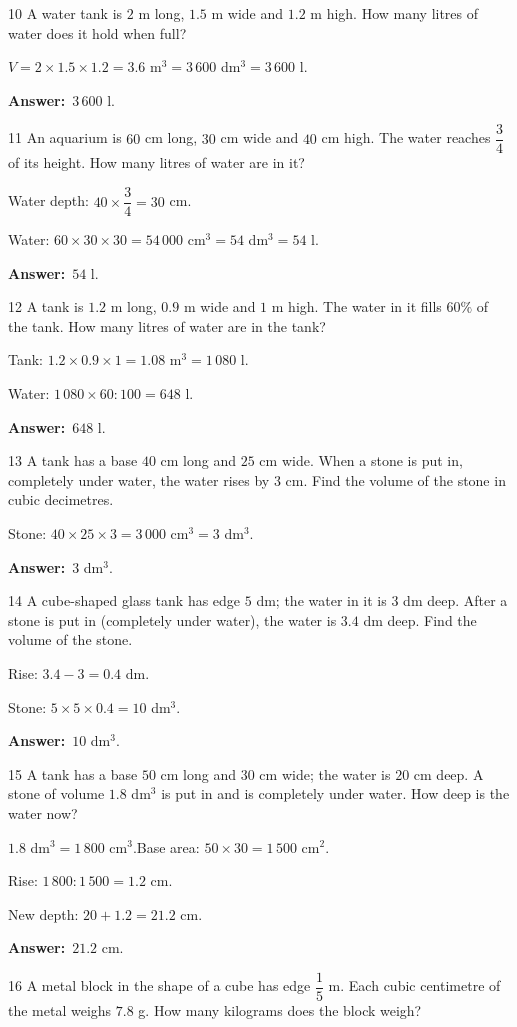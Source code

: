 \documentclass[11pt]{article}
\newif\ifsol \solfalse
\providecommand{\AnsWord}{Đáp số}
\newcommand{\dapso}[1]{\par\textbf{\AnsWord:}\ #1}
\newcommand{\probsol}[1]{%
  \begin{lrbox}{\solmeasure}\begin{minipage}{\dimexpr\linewidth-24pt\relax}#1\end{minipage}\end{lrbox}%
  \ifsol
    \begin{solbox}#1\end{solbox}%
  \else
    \setlength{\solht}{\dimexpr\ht\solmeasure+\dp\solmeasure+0.85cm\relax}%
    \ifdim\solht<1.35cm\setlength{\solht}{1.35cm}\fi
    \begin{tcolorbox}[colback=white,colframe=Line,boxrule=0.8pt,arc=5pt,
      left=8pt,right=8pt,top=4pt,bottom=4pt,height=\solht]{\footnotesize\color{Slate}\itshape\WorkWord}\end{tcolorbox}%
  \fi}
\newcommand{\gap}{\vspace{0.3cm}}
\def\WorkWord{Your work:}
\def\AnsWord{Answer}
\begin{document}
\gap
\begin{probbox}{10}{\relax}
A water tank is $2$ m long, $1.5$ m wide and $1.2$ m high. How many litres of water does it hold when full?
\end{probbox}
\probsol{
$V=2\times1.5\times1.2=3.6$ m$^3=3\,600$ dm$^3=3\,600$ l.
\dapso{$3\,600$ l.}}
\gap
\begin{probbox}{11}{\relax}
An aquarium is $60$ cm long, $30$ cm wide and $40$ cm high. The water reaches $\dfrac34$ of its height. How many litres of water are in it?
\end{probbox}
\probsol{
Water depth: $40\times\dfrac34=30$ cm.\par
Water: $60\times30\times30=54\,000$ cm$^3=54$ dm$^3=54$ l.
\dapso{$54$ l.}}
\gap
\begin{probbox}{12}{\relax}
A tank is $1.2$ m long, $0.9$ m wide and $1$ m high. The water in it fills $60\%$ of the tank. How many litres of water are in the tank?
\end{probbox}
\probsol{
Tank: $1.2\times0.9\times1=1.08$ m$^3=1\,080$ l.\par
Water: $1\,080\times60:100=648$ l.
\dapso{$648$ l.}}
\gap
\begin{probbox}{13}{\relax}
A tank has a base $40$ cm long and $25$ cm wide. When a stone is put in, completely under water, the water rises by $3$ cm. Find the volume of the stone in cubic decimetres.
\end{probbox}
\probsol{
Stone: $40\times25\times3=3\,000$ cm$^3=3$ dm$^3$.
\dapso{$3$ dm$^3$.}}
\gap
\begin{probbox}{14}{\relax}
A cube-shaped glass tank has edge $5$ dm; the water in it is $3$ dm deep. After a stone is put in (completely under water), the water is $3.4$ dm deep. Find the volume of the stone.
\end{probbox}
\probsol{
Rise: $3.4-3=0.4$ dm.\par
Stone: $5\times5\times0.4=10$ dm$^3$.
\dapso{$10$ dm$^3$.}}
\gap
\begin{probbox}{15}{\relax}
A tank has a base $50$ cm long and $30$ cm wide; the water is $20$ cm deep. A stone of volume $1.8$ dm$^3$ is put in and is completely under water. How deep is the water now?
\end{probbox}
\probsol{
$1.8$ dm$^3=1\,800$ cm$^3$.\quad Base area: $50\times30=1\,500$ cm$^2$.\par
Rise: $1\,800:1\,500=1.2$ cm.\par
New depth: $20+1.2=21.2$ cm.
\dapso{$21.2$ cm.}}
\gap
\begin{probbox}{16}{\relax}
A metal block in the shape of a cube has edge $\dfrac15$ m. Each cubic centimetre of the metal weighs $7.8$ g. How many kilograms does the block weigh?
\end{probbox}
\end{document}
